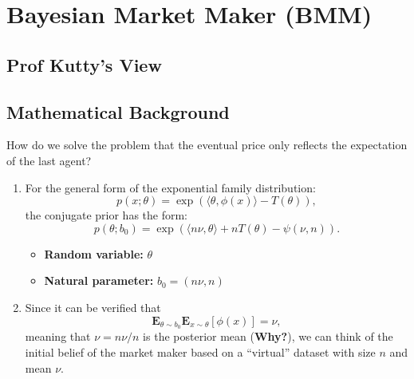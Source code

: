 \documentclass{article}
\begin{document}
    \section{Bayesian Market Maker (BMM)}
        \subsection{Prof Kutty's View}
        \subsection*{Mathematical Background}
        How do we solve the problem that the eventual price only reflects the expectation of the last agent?
        \begin{enumerate}
            \item For the general form of the exponential family distribution:
            \[ p(x;\theta)=\exp\left(\langle\theta,\phi(x)\rangle-T(\theta)\right), \]
            the conjugate prior has the form:
            \[ p(\theta;b_0)=\exp(\langle n\nu,\theta\rangle+nT(\theta)-\psi(\nu,n)). \]
            \begin{itemize}
                \item \textbf{Random variable:} $\theta$
                \item \textbf{Natural parameter:} $b_0=(n\nu,n)$
            \end{itemize}
            \item Since it can be verified that \[ \mathbf{E}_{\theta\sim b_0}\mathbf{E}_{x\sim\theta}[\phi(x)]=\nu, \] meaning that $\nu=n\nu/n$ is the posterior mean (\textbf{Why?}), we can think of the initial belief of the market maker based on a ``virtual'' dataset with size $n$ and mean $\nu$.
        \end{enumerate}
\end{document}
